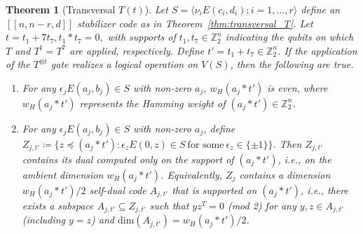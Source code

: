 \documentclass[twoside,romanappendices]{IEEEtran}
\newtheorem{theorem}{Theorem}
\newcommand{\llbr}{[\![}
\newcommand{\rrbr}{]\!]}
\begin{document}
\begin{theorem}[Transversal $T(t)$]
\label{thm:transversal_T_Tinv}
Let $S = \langle \nu_i E(c_i,d_i) ; i = 1,\ldots,r \rangle$ define an $\llbr n,n-r,d \rrbr$ stabilizer code as in Theorem~\ref{thm:transversal_T}.
Let $t = t_1 + 7 t_7, t_1 \ast t_7 = 0,$ with supports of $t_1, t_7 \in \mathbb{Z}_2^n$ indicating the qubits on which $T$ and $T^{\dagger} = T^7$ are applied, respectively.
Define $t' = t_1 + t_7 \in \mathbb{Z}_2^n$.
If the application of the $T^{\otimes t}$ gate realizes a logical operation on $V(S)$, then the following are true.


      

\begin{enumerate}

\item For any $\epsilon_j E(a_j,b_j) \in S$ with non-zero $a_j$, $w_H(a_j \ast t')$ is even, where $w_H(a_j \ast t')$ represents the Hamming weight of $(a_j \ast t') \in \mathbb{Z}_2^n$.

\item  For any $\epsilon_j E(a_j,b_j) \in S$ with non-zero $a_j$, define $Z_{j,t'} \coloneqq \{ z \preceq (a_j \ast t') \colon \epsilon_z E(0,z) \in S\ \text{for\ some}\ \epsilon_z \in \{ \pm 1 \} \}$. 
      Then $Z_{j,t'}$ contains its dual computed only on the support of $(a_j \ast t')$, i.e., on the ambient dimension $w_H(a_j \ast t')$.
      Equivalently, $Z_j$ contains a dimension $w_H(a_j \ast t')/2$ self-dual code $A_{j,t'}$ that is supported on $(a_j \ast t')$, i.e., there exists a subspace $A_{j,t'} \subseteq Z_{j,t'}$ such that $y z^T = 0$ (mod 2) for any $y,z \in A_{j,t'}$ (including $y = z$) and $\text{dim}(A_{j,t'}) = w_H(a_j \ast t')/2$.
      

\end{enumerate}
\end{theorem}
\end{document}
